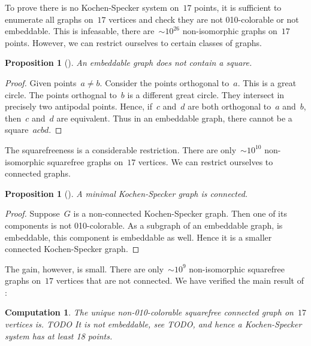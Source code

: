 \documentclass[a4paper]{article}
\newcounter{main}
\newtheorem{prop}[main]{Proposition}
\newtheorem{comp}[main]{Computation}
\theoremstyle{definition}
\theoremstyle{remark}
\begin{document}
To prove there is no Kochen-Specker system on~$17$ points,
it is sufficient to enumerate all graphs on~$17$ vertices
and check they are not 010-colorable or not embeddable.
This is infeasable, there are~${\sim}10^{26}$ non-isomorphic
graphs on~$17$ points.
However, we can restrict ourselves to certain classes of graphs.
\begin{prop}[\cite{aow11}]
    An embeddable graph does not contain a square.
\end{prop}
\begin{proof}
    Given points~$a\neq b$.
    Consider the points orthogonal to~$a$.
    This is a great circle.
    The points orthognal to~$b$ is a different great circle.
    They intersect in precisely two antipodal points.
    Hence, if~$c$ and~$d$ are both orthogonal to~$a$ and~$b$,
    then~$c$ and~$d$ are equivalent.
    Thus in an embeddable graph, there cannot be a square~$acbd$.
\end{proof}
The squarefreeness is a considerable restriction.  There are
only~${\sim}10^{10}$ non-isomorphic squarefree graphs on~$17$ vertices.
We can restrict ourselves to connected graphs.
\begin{prop}[\cite{aow11}]\label{prop:ks-conn}
    A minimal Kochen-Specker graph is connected.
\end{prop}
\begin{proof}
    Suppose~$G$ is a non-connected Kochen-Specker graph.
    Then one of its components is not 010-colorable.
    As a subgraph of an embeddable graph, is embeddable,
    this component is embeddable as well.
    Hence it is a smaller connected Kochen-Specker graph.
\end{proof}
The gain, however, is small.
There are only~${\sim}10^9$ non-isomorphic squarefree graphs on~$17$
vertices that are not connected.
We have verified the main result of \cite{aow11}:
\begin{comp}
The unique non-010-colorable squarefree connected graph on~$17$
vertices is. TODO
It is not embeddable, see TODO, and hence a Kochen-Specker
system has at least 18 points.
\end{comp}
\end{document}

